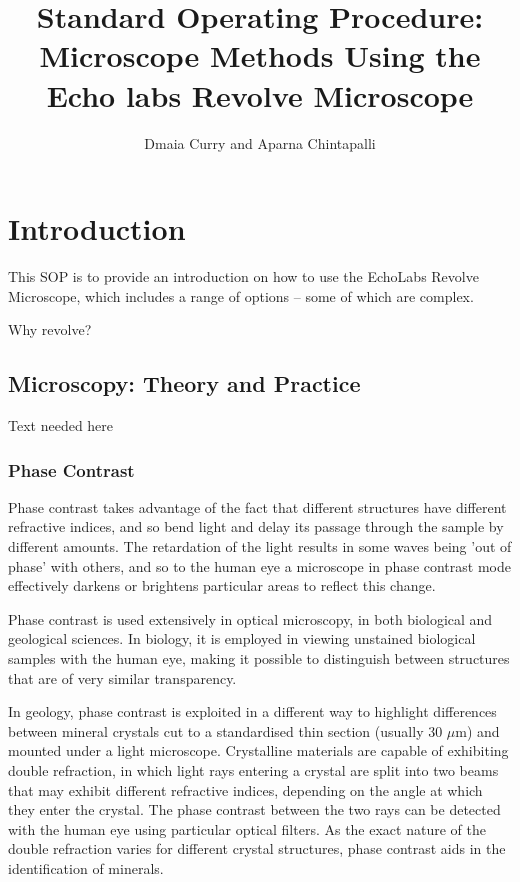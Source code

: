 \documentclass{article}
\title{Standard Operating Procedure: Microscope Methods Using the Echo labs Revolve Microscope}
\author{Dmaia Curry and Aparna Chintapalli}
\begin{document}


\maketitle

\section{Introduction}

This SOP is to provide an introduction on how to use the EchoLabs Revolve Microscope, which includes a range of options -- some of which are complex.

Why revolve?

\subsection{Microscopy: Theory and Practice}

Text needed here

\subsubsection{Phase Contrast}

Phase contrast takes advantage of the fact that different structures have different refractive indices, and so bend light and delay its passage through the sample by different amounts. The retardation of the light results in some waves being 'out of phase' with others, and so to the human eye a microscope in phase contrast mode effectively darkens or brightens particular areas to reflect this change.

Phase contrast is used extensively in optical microscopy, in both biological and geological sciences. In biology, it is employed in viewing unstained biological samples with the human eye, making it possible to distinguish between structures that are of very similar transparency.

In geology, phase contrast is exploited in a different way to highlight differences between mineral crystals cut to a standardised thin section (usually 30 $\mu$m) and mounted under a light microscope. Crystalline materials are capable of exhibiting double refraction, in which light rays entering a crystal are split into two beams that may exhibit different refractive indices, depending on the angle at which they enter the crystal. The phase contrast between the two rays can be detected with the human eye using particular optical filters. As the exact nature of the double refraction varies for different crystal structures, phase contrast aids in the identification of minerals.
\end{document}
